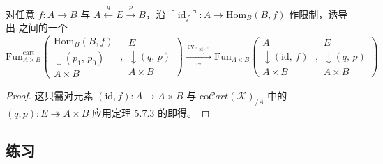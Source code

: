 \providecommand{\Cart}{\mathcal{C}art}
\providecommand{\coCart}{\mathrm{co}\mathcal{C}\mathit{art}}   %
\providecommand{\Fib}{\mathcal{F}ib}
\providecommand{\Mod}{\mathrm{Mod}}
\providecommand{\Fun}{\operatorname{Fun}}
\providecommand{\qcor}[1]{\ulcorner#1\urcorner}   %


\begin{proposition}\label{prop:one-sided-yoneda-two-sided}
对任意\trFunctor{} $f\colon A\to B$ 与\trTwoSidedIsofibration{}
$A\xleftarrow{q}E\xrightarrow{p}B$，沿
$\qcor{\mathrm{id}_{f}}\colon A\to\mathrm{Hom}_{B}(B,f)$ 作限制，诱导出%
\trQuasiCategory{}之间的一个\trEquivalence
{\small\[
\mathrm{Fun}_{A\times B}^{\mathrm{cart}}\!\left(
\begin{gathered}
\mathrm{Hom}_{B}(B,f)\\[-2pt]
\downarrow\scriptstyle (p_{1},\,p_{0})\\[-2pt]
A\times B
\end{gathered}
\;\right.,
\left.
\begin{gathered}
E\\[-2pt]
\downarrow\scriptstyle (q,\,p)\\[-2pt]
A\times B
\end{gathered}
\right)
\xrightarrow[\ \sim\ ]{\ \mathrm{ev}_{\qcor{\mathrm{id}_{f}}}\ }
\mathrm{Fun}_{A\times B}\!\left(
\begin{gathered}
A\\[-2pt]
\downarrow\scriptstyle (\mathrm{id},\,f)\\[-2pt]
A\times B
\end{gathered}
\;\right.,
\left.
\begin{gathered}
E\\[-2pt]
\downarrow\scriptstyle (q,\,p)\\[-2pt]
A\times B
\end{gathered}
\right)
\]}
\end{proposition}

\begin{proof}
这只需对元素 $(\mathrm{id},f)\colon A\to A\times B$ 与\trInfinityCosmos{}
$\coCart(\mathcal{K})_{/A}$ 中的\trCartesianFibration{}
$(q,p)\colon E\twoheadrightarrow A\times B$ 应用定理 5.7.3 的\trYonedaLemma{}即得。
\end{proof}

\subsection*{练习}

